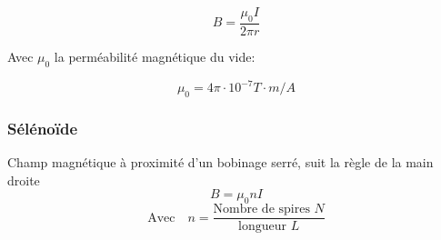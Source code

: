 \begin{multicols*}{2}
    \[ B = \frac{\mu_0 I}{2 \pi r} \]
    
    Avec $\mu_0$ la perméabilité magnétique du vide:
    
    \[ \mu_0 = 4\pi \cdot 10^{-7} T\cdot m/A \]
    
    \subsubsection{Sélénoïde}
    Champ magnétique à proximité d'un bobinage serré, suit la règle de la main droite
    \[ B = \mu_0 n I \]
    \[ \text{Avec} \quad n = \frac{\text{Nombre de spires $N$}}{\text{longueur $L$}} \]
    
\end{multicols*}